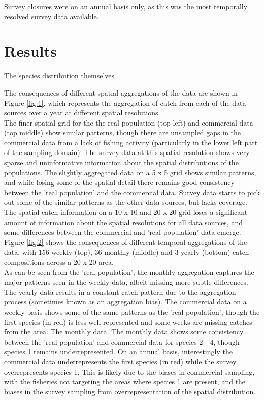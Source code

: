 \documentclass[review]{elsarticle}
\begin{document}
Survey closures were on an annual basis only, as this was the most temporally
resolved survey data available.

\section{Results}

The species distribution themselves 

The consequences of different spatial aggregations of the data are shown in
Figure \ref{fig:1}, which represents the aggregation of catch from each of the
data sources over a year at different spatial resolutions. \\

The finer spatial grid for the the real population (top left) and commercial
data (top middle) show similar patterns, though there are unsampled gaps in the
commercial data from a lack of fishing activity (particularly in the lower left
part of the sampling domain). The survey data at this spatial resolution shows
very sparse and uninformative information about the spatial distributions of
the populations. The slightly aggregated data on a 5 x 5 grid shows similar
patterns, and while losing some of the spatial detail there remains good
consistency between the 'real population' and the commercial data. Survey data
starts to pick out some of the similar patterns as the other data sources, but
lacks coverage. The spatial catch information on a 10 x 10 and 20 x 20 grid
loses a significant amount of information about the spatial resolutions for all
data sources, and some differences between the commercial and 'real population'
data emerge. \\

Figure \ref{fig:2} shows the consequences of different temporal aggregations of
the data, with 156 weekly (top), 36 monthly (middle) and 3 yearly (bottom)
catch compositions across a 20 x 20 area. \\

As can be seen from the 'real population', the monthly aggregation captures the
major patterns seen in the weekly data, albeit missing more subtle differences.
The yearly data results in a constant catch pattern due to the aggregation
process (sometimes known as an aggregation bias). The commercial data on a
weekly basis shows some of the same patterns as the 'real population', though
the first species (in red) is less well represented and some weeks are missing
catches from the area. The monthly data. The monthly data shows some
consistency between the 'real population' and commercial data for species 2 -
4, though species 1 remains underrepresented. On an annual basis, interestingly
the commercial data underrepresents the first species (in red) while the survey
overrepresents species 1. This is likely due to the biases in commercial
sampling, with the fisheries not targeting the areas where species 1 are
present, and the biases in the survey sampling from overrepresentation of the
spatial distribution. \\
\end{document}
